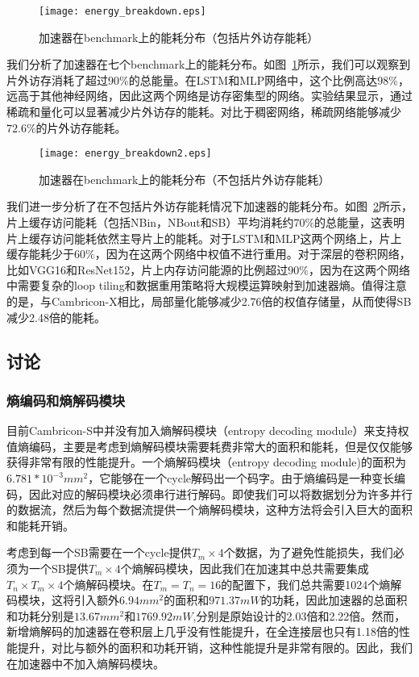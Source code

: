\begin{figure}[h]
\centering
\texttt{[image: energy\_breakdown.eps]}
\caption{加速器在benchmark上的能耗分布（包括片外访存能耗）}
\label{fig:energy_breakdown}
\end{figure}

我们分析了加速器在七个benchmark上的能耗分布。如图~\ref{fig:energy_breakdown}所示，我们可以观察到片外访存消耗了超过$90\%$的总能量。在LSTM和MLP网络中，这个比例高达$98\%$，远高于其他神经网络，因此这两个网络是访存密集型的网络。实验结果显示，通过稀疏和量化可以显著减少片外访存的能耗。对比于稠密网络，稀疏网络能够减少$72.6\%$的片外访存能耗。

\begin{figure}[h]
\centering
\texttt{[image: energy\_breakdown2.eps]}
\caption{加速器在benchmark上的能耗分布（不包括片外访存能耗）}
\label{fig:energy_breakdown2}
\end{figure}

我们进一步分析了在不包括片外访存能耗情况下加速器的能耗分布。如图~\ref{fig:energy_breakdown2}所示，片上缓存访问能耗（包括NBin，NBout和SB）平均消耗约$70\%$的总能量，这表明片上缓存访问能耗依然主导片上的能耗。对于LSTM和MLP这两个网络上，片上缓存能耗少于$60\%$，因为在这两个网络中权值不进行重用。对于深层的卷积网络，比如VGG16和ResNet152，片上内存访问能源的比例超过$90\%$，因为在这两个网络中需要复杂的loop tiling和数据重用策略将大规模运算映射到加速器熵。值得注意的是，与Cambricon-X相比，局部量化能够减少2.76倍的权值存储量，从而使得SB减少2.48倍的能耗。

\subsection{讨论}

\subsubsection{熵编码和熵解码模块}
\label{subsubsec:encoding_hw}

目前Cambricon-S中并没有加入熵解码模块（entropy decoding module）来支持权值熵编码，主要是考虑到熵解码模块需要耗费非常大的面积和能耗，但是仅仅能够获得非常有限的性能提升。一个熵解码模块（entropy decoding module)的面积为$6.781*10^{-3}mm^2$，它能够在一个cycle解码出一个码字。由于熵编码是一种变长编码，因此对应的解码模块必须串行进行解码。即使我们可以将数据划分为许多并行的数据流，然后为每个数据流提供一个熵解码模块，这种方法将会引入巨大的面积和能耗开销。

考虑到每一个SB需要在一个cycle提供$T_m\times 4$个数据，为了避免性能损失，我们必须为一个SB提供$T_m\times 4$个熵解码模块，因此我们在加速其中总共需要集成$T_n\times T_m\times 4$个熵解码模块。在$T_m = T_n = 16$的配置下，我们总共需要1024个熵解码模块，这将引入额外$6.94mm^2$的面积和$971.37mW$的功耗，因此加速器的总面积和功耗分别是$13.67mm^2$和$1769.92mW$,分别是原始设计的2.03倍和2.22倍。然而，新增熵解码的加速器在卷积层上几乎没有性能提升，在全连接层也只有1.18倍的性能提升，对比与额外的面积和功耗开销，这种性能提升是非常有限的。因此，我们在加速器中不加入熵解码模块。

